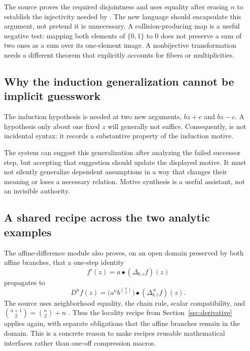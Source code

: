 \documentclass[11pt,letterpaper]{article}
\newcommand{\code}[1]{\texttt{\detokenize{#1}}}
\theoremstyle{remark}
\begin{document}
The source proves the required disjointness and uses equality after erasing $n$ to establish the injectivity needed by \code{sum_image} \cite{proveit-affine}. The new language should encapsulate this argument, not pretend it is unnecessary. A collision-producing map is a useful negative test: mapping both elements of $\{0,1\}$ to $0$ does not preserve a sum of two ones as a sum over its one-element image. A nonbijective transformation needs a different theorem that explicitly accounts for fibers or multiplicities.

\subsection{Why the induction generalization cannot be implicit guesswork}

The induction hypothesis is needed at two new arguments, $bz+c$ and $bz-c$. A hypothesis only about one fixed $z$ will generally not suffice. Consequently, \code{generalizing z} is not incidental syntax: it records a substantive property of the induction motive.

The system can suggest this generalization after analyzing the failed successor step, but accepting that suggestion should update the displayed motive. It must not silently generalize dependent assumptions in a way that changes their meaning or loses a necessary relation. Motive synthesis is a useful assistant, not an invisible authority.

\subsection{A shared recipe across the two analytic examples}

The affine-difference module also proves, on an open domain preserved by both affine branches, that a one-step identity
\[
 f'(z)=a\mathbin{\bullet}(\Delta_{b,c}f)(z)
\]
propagates to
\begin{equation}
 D^nf(z)=\bigl(a^nb^{\binom n2}\bigr)\mathbin{\bullet}
                (\Delta_{b,c}^{\,n}f)(z).
 \label{eq:orbit-derivatives}
\end{equation}
The source uses neighborhood equality, the chain rule, scalar compatibility, and $\binom{n+1}{2}=\binom n2+n$ \cite{proveit-affine}. Thus the locality recipe from Section~\ref{sec:derivative} applies again, with separate obligations that the affine branches remain in the domain. This is a concrete reason to make recipes reusable mathematical interfaces rather than one-off compression macros.
\end{document}
